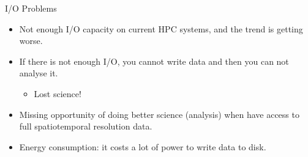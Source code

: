 \documentclass[compress,11pt,xcolor=svgnames,aspectratio=169]{beamer}
\begin{document}
\begin{frame}[fragile]{I/O Problems}

\begin{itemize}
\setlength\itemsep{0.7cm}

\item Not enough I/O capacity on current HPC systems, and the trend is getting worse.

\item If there is not enough I/O, you cannot write data and then you can not analyse it.
    \begin{itemize}
        \item Lost science!
    \end{itemize}

\item Missing opportunity of doing better science (analysis) when have access to full spatiotemporal resolution data.

\item Energy consumption: it costs a lot of power to write data to disk.

\end{itemize}

\nocite{sensei-sc17}

\end{frame}
\end{document}
